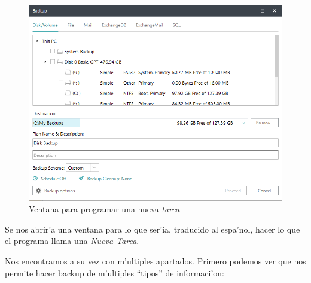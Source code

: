 \documentclass[11pt]{article}
\begin{document}
	\begin{figure}[H]
		\centering
		\includegraphics[width=.8\textwidth]{Images/easeus/use_newtask}
		\caption{Ventana para programar una nueva \textit{tarea}}
	\end{figure}
	
	Se nos abrir'a una ventana para lo que ser'ia, traducido al espa'nol, hacer lo que el programa llama una \textit{Nueva Tarea}.
	
	Nos encontramos a su vez con m'ultiples apartados. Primero podemos ver que nos permite hacer backup de m'ultiples ``tipos'' de informaci'on:
	
\end{document}

